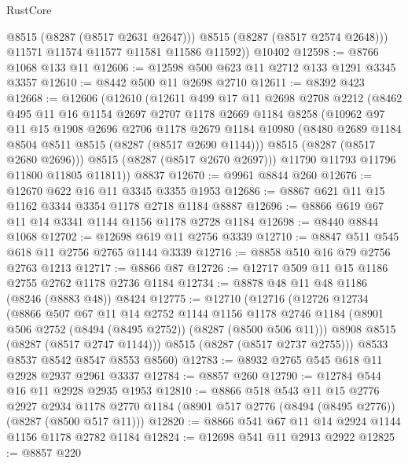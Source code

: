 \begin{lexlean}{RustCore}
\begin{coremodule}
            @8515
            (@8287 (@8517 @2631 @2647)))
          @8515
          (@8287 (@8517 @2574 @2648)))
        @11571
        @11574
        @11577
        @11581
        @11586
        @11592))
    @10402
@12598 := @8766 @1068 @133 @11
@12606 := @12598 @500 @623 @11 @2712 @133 @1291 @3345 @3357
@12610 := @8442 @500 @11 @2698 @2710
@12611 := @8392 @423
@12668 := @12606
    (@12610
      (@12611
        @499
        @17
        @11
        @2698
        @2708
        @2212
        (@8462
          @495
          @11
          @16
          @1154
          @2697
          @2707
          @1178
          @2669
          @1184
          @8258
          (@10962
            @97
            @11
            @15
            @1908
            @2696
            @2706
            @1178
            @2679
            @1184
            @10980
            (@8480 @2689 @1184 @8504 @8511 @8515 (@8287 (@8517 @2690 @1144)))
            @8515
            (@8287 (@8517 @2680 @2696)))
          @8515
          (@8287 (@8517 @2670 @2697)))
        @11790
        @11793
        @11796
        @11800
        @11805
        @11811))
    @8837
@12670 := @9961 @8844 @260
@12676 := @12670 @622 @16 @11 @3345 @3355 @1953
@12686 := @8867 @621 @11 @15 @1162 @3344 @3354 @1178 @2718 @1184 @8887
@12696 := @8866 @619 @67 @11 @14 @3341 @1144 @1156 @1178 @2728 @1184
@12698 := @8440 @8844 @1068
@12702 := @12698 @619 @11 @2756 @3339
@12710 := @8847 @511 @545 @618 @11 @2756 @2765 @1144 @3339
@12716 := @8858 @510 @16 @79 @2756 @2763 @1213
@12717 := @8866 @87
@12726 := @12717 @509 @11 @15 @1186 @2755 @2762 @1178 @2736 @1184
@12734 := @8878 @48 @11 @48 @1186 (@8246 (@8883 @48)) @8424
@12775 := @12710
    (@12716
      (@12726
        @12734
        (@8866
          @507
          @67
          @11
          @14
          @2752
          @1144
          @1156
          @1178
          @2746
          @1184
          (@8901 @506 @2752 (@8494 (@8495 @2752)) (@8287 (@8500 @506 @11)))
          @8908
          @8515
          (@8287 (@8517 @2747 @1144)))
        @8515
        (@8287 (@8517 @2737 @2755)))
      @8533
      @8537
      @8542
      @8547
      @8553
      @8560)
@12783 := @8932 @2765 @545 @618 @11 @2928 @2937 @2961 @3337
@12784 := @8857 @260
@12790 := @12784 @544 @16 @11 @2928 @2935 @1953
@12810 := @8866
    @518
    @543
    @11
    @15
    @2776
    @2927
    @2934
    @1178
    @2770
    @1184
    (@8901 @517 @2776 (@8494 (@8495 @2776)) (@8287 (@8500 @517 @11)))
@12820 := @8866 @541 @67 @11 @14 @2924 @1144 @1156 @1178 @2782 @1184
@12824 := @12698 @541 @11 @2913 @2922
@12825 := @8857 @220

\end{coremodule}
\end{lexlean}
